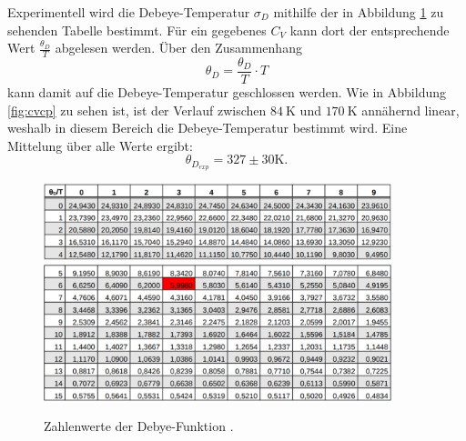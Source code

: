 Experimentell wird die Debeye-Temperatur $\sigma_D$ mithilfe der in Abbildung \ref{fig:deb} zu sehenden Tabelle bestimmt. Für ein gegebenes $C_V$ kann dort der entsprechende Wert $\frac{\theta_D}{T}$ abgelesen werden. Über den Zusammenhang 
\begin{equation}
    \theta_D = \frac{\theta_D}{T} \cdot T
\end{equation}
kann damit auf die Debeye-Temperatur geschlossen werden. 
Wie in Abbildung \ref{fig:cvcp} zu sehen ist, ist der Verlauf zwischen $\SI{84}{\kelvin}$ und $\SI{170}{\kelvin}$ annähernd linear, weshalb in diesem Bereich die Debeye-Temperatur bestimmt wird. 
Eine Mittelung über alle Werte ergibt:
\begin{equation}
    \theta_{D_{exp}} = 327 \pm 30 \si{\kelvin}.
\end{equation} 
\begin{figure}
    \centering
    \includegraphics[width=0.9\textwidth]{content/images/table1.png}
    \includegraphics[width=0.9\textwidth]{content/images/table2.png}
    \caption{Zahlenwerte der Debye-Funktion \cite{anleitung}.}
    \label{fig:deb}
\end{figure}